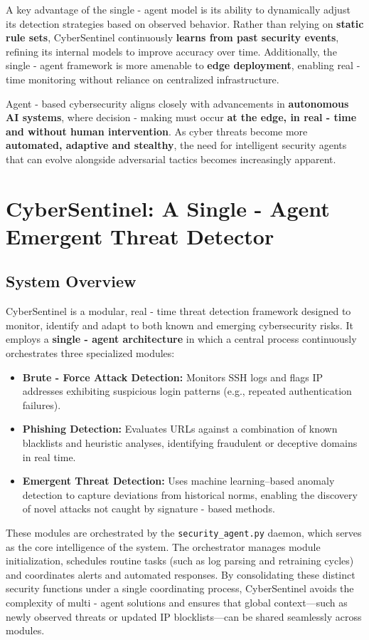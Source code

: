 \documentclass{article}
\begin{document}
A key advantage of the single - agent model is its ability to dynamically adjust its detection strategies based on observed behavior. Rather than relying on \textbf{static rule sets}, CyberSentinel continuously \textbf{learns from past security events}, refining its internal models to improve accuracy over time. Additionally, the single - agent framework is more amenable to \textbf{edge deployment}, enabling real - time monitoring without reliance on centralized infrastructure.

Agent - based cybersecurity aligns closely with advancements in \textbf{autonomous AI systems}, where decision - making must occur \textbf{at the edge, in real - time and without human intervention}. As cyber threats become more \textbf{automated, adaptive and stealthy}, the need for intelligent security agents that can evolve alongside adversarial tactics becomes increasingly apparent.

\section{CyberSentinel: A Single - Agent Emergent Threat Detector}

\subsection{System Overview}
CyberSentinel is a modular, real - time threat detection framework designed to monitor, identify and adapt to both known and emerging cybersecurity risks. It employs a \textbf{single - agent architecture} in which a central process continuously orchestrates three specialized modules:

\begin{itemize}
    \item \textbf{Brute - Force Attack Detection:} Monitors SSH logs and flags IP addresses exhibiting suspicious login patterns (e.g., repeated authentication failures).
    \item \textbf{Phishing Detection:} Evaluates URLs against a combination of known blacklists and heuristic analyses, identifying fraudulent or deceptive domains in real time.
    \item \textbf{Emergent Threat Detection:} Uses machine learning–based anomaly detection to capture deviations from historical norms, enabling the discovery of novel attacks not caught by signature - based methods.
\end{itemize}

These modules are orchestrated by the \texttt{security\_agent.py} daemon, which serves as the core intelligence of the system. The orchestrator manages module initialization, schedules routine tasks (such as log parsing and retraining cycles) and coordinates alerts and automated responses. By consolidating these distinct security functions under a single coordinating process, CyberSentinel avoids the complexity of multi - agent solutions and ensures that global context—such as newly observed threats or updated IP blocklists—can be shared seamlessly across modules.
\end{document}
